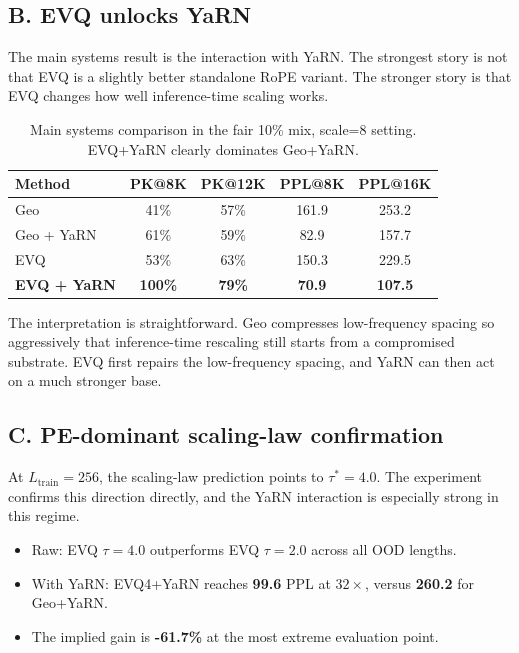 \documentclass[11pt]{article}
\begin{document}
\subsection*{B. EVQ unlocks YaRN}

The main systems result is the interaction with YaRN. The strongest story is
not that EVQ is a slightly better standalone RoPE variant. The stronger story
is that EVQ changes how well inference-time scaling works.

\begin{table}[H]
\centering
\small
\begin{tabular}{lcccc}
\toprule
Method & PK@8K & PK@12K & PPL@8K & PPL@16K \\
\midrule
Geo & 41\% & 57\% & 161.9 & 253.2 \\
Geo + YaRN & 61\% & 59\% & 82.9 & 157.7 \\
EVQ & 53\% & 63\% & 150.3 & 229.5 \\
\textbf{EVQ + YaRN} & \textbf{100\%} & \textbf{79\%} & \textbf{70.9} & \textbf{107.5} \\
\bottomrule
\end{tabular}
\caption{Main systems comparison in the fair 10\% mix, scale=8 setting. EVQ+YaRN clearly dominates Geo+YaRN.}
\end{table}

The interpretation is straightforward. Geo compresses low-frequency spacing so
aggressively that inference-time rescaling still starts from a compromised
substrate. EVQ first repairs the low-frequency spacing, and YaRN can then act
on a much stronger base.

\subsection*{C. PE-dominant scaling-law confirmation}

At $L_{\text{train}}=256$, the scaling-law prediction points to $\tau^*=4.0$.
The experiment confirms this direction directly, and the YaRN interaction is
especially strong in this regime.

\begin{itemize}
  \item Raw: EVQ $\tau=4.0$ outperforms EVQ $\tau=2.0$ across all OOD lengths.
  \item With YaRN: EVQ4+YaRN reaches \textbf{99.6} PPL at $32\times$, versus \textbf{260.2} for Geo+YaRN.
  \item The implied gain is \textbf{-61.7\%} at the most extreme evaluation point.
\end{itemize}
\end{document}
